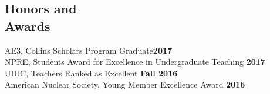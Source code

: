 \documentclass[margin,line]{resume}
\begin{document}
\begin{resume}
    \section{\mysidestyle Honors and\\Awards}
                AE3, Collins Scholars Program Graduate\hfill \textbf{2017}\vspace{.5mm}\\%
                NPRE, Students Award for Excellence in Undergraduate Teaching \hfill \textbf{2017}\vspace{.5mm}\\%
                UIUC, Teachers Ranked as Excellent \hfill \textbf{Fall 2016}\vspace{.5mm}\\%
                American Nuclear Society, Young Member Excellence Award                         \hfill \textbf{2016}\vspace{.5mm}\\%
%
%

\end{resume}
\end{document}

